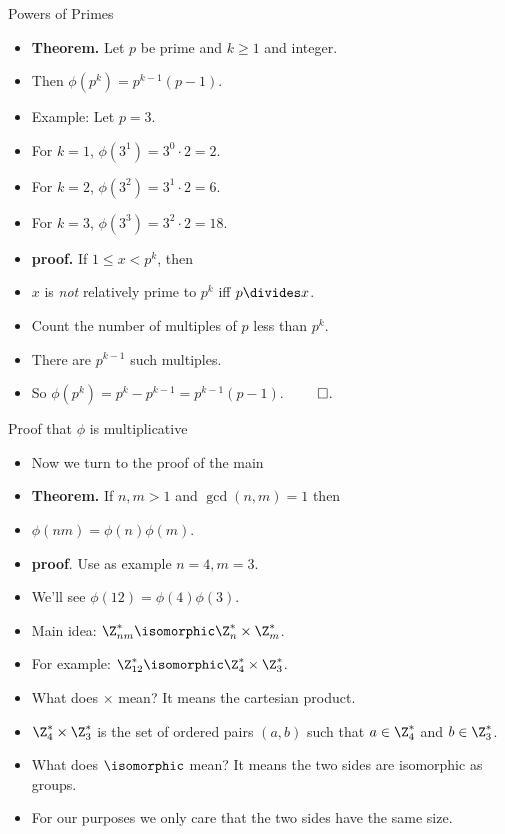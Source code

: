 \documentclass{beamer}
\begin{document}
\begin{frame}{Powers of Primes}

\begin{itemize}
  \item \textbf{Theorem.} Let $p$ be prime and $k\geq 1$ and integer.
  \item Then $\phi(p^k) = p^{k-1} (p-1)$.
  \item Example: Let $p=3$.
  \item For $k=1$, $\phi(3^1) = 3^0\cdot 2 = 2$.
  \item For $k=2$, $\phi(3^2) = 3^1\cdot 2 = 6$.
  \item For $k=3$, $\phi(3^3) = 3^2\cdot 2 = 18$.
  \item \textbf{proof.} If $1\leq x < p^k$, then
  \item $x$ is \emph{not} relatively prime to $p^k$ iff $p\divides x$.
  \item  Count the number of multiples of $p$ less than $p^k$.
  \item There are $p^{k-1}$ such multiples.
  \item So $\phi(p^k) = p^k - p^{k-1} = p^{k-1}(p-1)$. $\qed$.
\end{itemize}

\end{frame}

\begin{frame}{Proof that $\phi$ is multiplicative}

\begin{itemize}
  \item Now we turn to the proof of the main
  \item \textbf{Theorem.} If $n,m>1$ and $\gcd(n,m)=1$ then
  \item $\phi(nm) = \phi(n)\phi(m)$.
  \item \textbf{proof}. Use as example $n=4, m=3$.
  \item We'll see $\phi(12) = \phi(4)\phi(3)$.
  \item Main idea: $\Z_{nm}^* \isomorphic \Z_n^* \times \Z_m^*$.
  \item For example: $\Z_{12}^* \isomorphic \Z_4^* \times \Z_3^*$.
  \item What does $\times$ mean? It means the cartesian product.
  \item $\Z_4^* \times \Z_3^*$ is the set
  of ordered pairs $(a,b)$ such that $a\in\Z_4^*$ and $b\in\Z_3^*$.
  \item What does $\isomorphic$ mean? It means the two sides are isomorphic as groups.
  \item For our purposes we only care that the two sides have the same size.
\end{itemize}

\end{frame}
\end{document}
